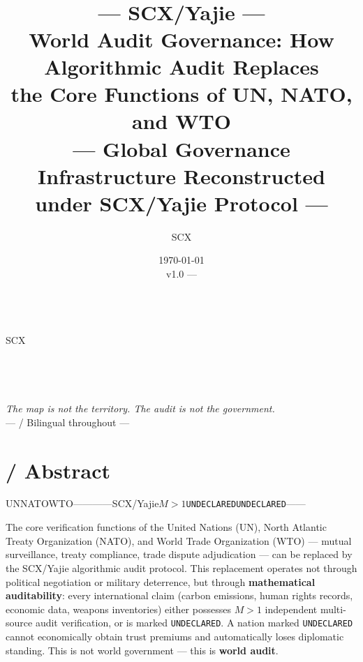 \documentclass[12pt,a4paper]{article}
\title{
    {\Huge \textbf{}}\\[0.3cm]
    {\Large }\\[0.5cm]
    {\large — SCX/Yajie —}\\[1cm]
    {\normalsize World Audit Governance: How Algorithmic Audit Replaces}\\
    {\normalsize the Core Functions of UN, NATO, and WTO}\\
    {\normalsize — Global Governance Infrastructure Reconstructed under SCX/Yajie Protocol —}
}
\author{SCX}\\[0.2cm]
\date{
    \today\\[0.2cm]
    \small  v1.0 — 
}
\theoremstyle{remark}
\newcommand{\UNDECLARED}{\texttt{UNDECLARED}}
\begin{document}
\maketitle
\thispagestyle{empty}


\newpage
\vspace*{5cm}
\begin{center}
    \Large\textbf{}\\[0.5cm]
    \normalsize SCX\\[0.3cm]
    \textbf{}\\[0.3cm]
    \ \textbf{}\\[0.3cm]
    \textbf{}\\[0.2cm]
    \\[1cm]
    \normalsize\textit{The map is not the territory. The audit is not the government.}\\[1cm]
    \small ---  / Bilingual throughout ---
\end{center}
\thispagestyle{empty}


\newpage
\tableofcontents
\newpage


\section{ / Abstract}

\begin{keybox}[title=\textbf{ / Core Thesis}]
    UNNATOWTO\textbf{}————SCX/Yajie\textbf{}$M>1$\UNDECLARED\UNDECLARED{}——\textbf{}

    \medskip
    The core verification functions of the United Nations (UN), North Atlantic Treaty Organization (NATO), and World Trade Organization (WTO) — mutual surveillance, treaty compliance, trade dispute adjudication — can be replaced by the SCX/Yajie algorithmic audit protocol. This replacement operates not through political negotiation or military deterrence, but through \textbf{mathematical auditability}: every international claim (carbon emissions, human rights records, economic data, weapons inventories) either possesses $M>1$ independent multi-source audit verification, or is marked \UNDECLARED. A nation marked \UNDECLARED{} cannot economically obtain trust premiums and automatically loses diplomatic standing. This is not world government — this is \textbf{world audit}.
\end{keybox}
\end{document}
